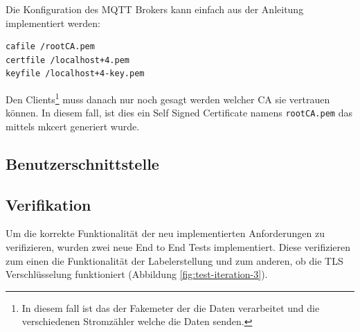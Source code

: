 Die Konfiguration des \ac{MQTT} Brokers kann einfach aus der Anleitung \parencite{mosquitto.conf_man_page_2021}
implementiert werden:

\begin{verbatim}
cafile /rootCA.pem
certfile /localhost+4.pem
keyfile /localhost+4-key.pem
\end{verbatim}

Den Clients\footnote{
    In diesem fall ist das der Fakemeter der die Daten verarbeitet und die verschiedenen
    Stromzähler welche die Daten senden.
} muss danach nur noch gesagt werden welcher \ac{CA} sie vertrauen können.
In diesem fall, ist dies ein Self Signed Certificate namens \texttt{rootCA.pem} das mittels
mkcert generiert wurde.

\subsection{Benutzerschnittstelle}

\subsection{Verifikation}

Um die korrekte Funktionalität der neu implementierten Anforderungen zu verifizieren, wurden
zwei neue End to End Tests implementiert. Diese verifizieren zum einen die Funktionalität der
Labelerstellung und zum anderen, ob die \ac{TLS} Verschlüsselung funktioniert (Abbildung \ref{fig:test-iteration-3}).

